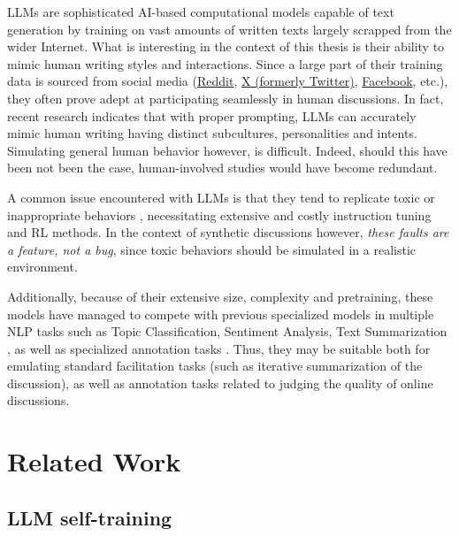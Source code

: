 \acp{LLM} are sophisticated \ac{AI}-based computational models capable of text generation by training on vast amounts of written texts largely scrapped from the wider Internet. 
What is interesting in the context of this thesis is their ability to mimic human writing styles and interactions. Since a large part of their training data is sourced from social media (\href{https://www.reddit.com}{Reddit}, \href{https://www.twitter.com}{X (formerly Twitter)}, \href{https://www.facebook.com}{Facebook}, etc.), they often prove adept at participating seamlessly in human discussions. In fact, recent research \cite{Vezhnevets2023GenerativeAM, aher2023usinglargelanguagemodels} indicates that with proper prompting, LLMs can accurately mimic human writing having distinct subcultures, personalities and intents. Simulating general human behavior however, is difficult. Indeed, should this have been not been the case, human-involved studies would have become redundant.

A common issue encountered with LLMs is that they tend to replicate toxic or inappropriate behaviors \cite{Birkun_Gautam_2023}, necessitating extensive and costly instruction tuning and \ac{RL} methods. In the context of synthetic discussions however, \textit{these faults are a feature, not a bug}, since toxic behaviors should be simulated in a realistic environment.

Additionally, because of their extensive size, complexity and pretraining, these models have managed to compete with  previous specialized models in multiple \ac{NLP} tasks such as Topic Classification, Sentiment Analysis, Text Summarization \cite{ts2024}, as well as specialized annotation tasks \cite{tan2024largelanguagemodelsdata}. Thus, they may be suitable both for emulating standard facilitation tasks (such as iterative summarization of the discussion), as well as annotation tasks related to judging the quality of online discussions.

\section{Related Work}
\label{sec:related:sec2}

\subsection{LLM self-training}
\label{sec:related:self-train}

